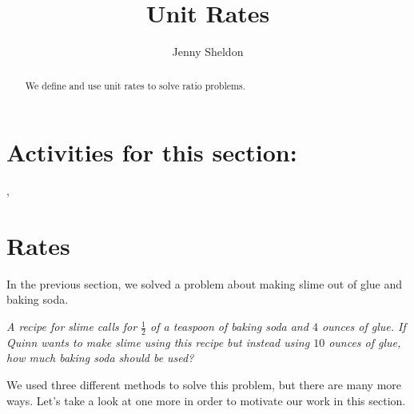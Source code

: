\documentclass{ximera}
\title{Unit Rates}
\author{Jenny Sheldon}
\begin{document}
\begin{abstract}
We define and use unit rates to solve ratio problems.
\end{abstract}
\maketitle

\section{Activities for this section:} 
, 

\section{Rates}

In the previous section, we solved a problem about making slime out of glue and baking soda.

\emph{A recipe for slime calls for $\frac{1}{2}$ of a teaspoon of baking soda and $4$ ounces of glue. If Quinn wants to make slime using this recipe but instead using $10$ ounces of glue, how much baking soda should be used?}

We used three different methods to solve this problem, but there are many more ways. Let's take a look at one more in order to motivate our work in this section.
\end{document}

